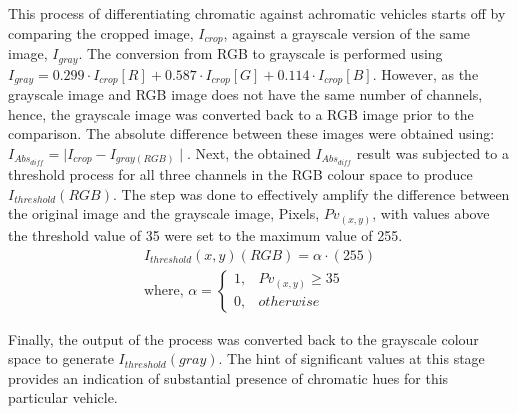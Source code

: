 This process of differentiating chromatic against achromatic vehicles starts off by comparing the cropped image, $I_{crop}$, against a grayscale version of the same image, $I_{gray}$. The conversion from RGB to grayscale is performed using $I_{gray} = 0.299 \cdot I_{crop}[R]+0.587 \cdot I_{crop}[G]+0.114 \cdot I_{crop}[B]$. However, as the grayscale image and RGB image does not have the same number of channels, hence, the grayscale image was converted back to a RGB image prior to the comparison.
The absolute difference between these images were obtained using: $I_{Abs_{diff}} = \mid I_{crop} - I_{gray(RGB)} \mid$. Next, the obtained $I_{Abs_{diff}}$ result was subjected to a threshold process for all three channels in the RGB colour space to produce $I_{threshold}(RGB)$. 
The step was done to effectively amplify the difference between the original image and the grayscale image, Pixels, $Pv_{(x,y)}$, with values above the threshold value of 35 were set to the maximum value of 255. 
\begin{align*}
\label{eq:threshabsolutediff}
I_{threshold}(x,y)(RGB) = \alpha \cdot (255) \\
\text{where, } 
\alpha = 
\begin{cases}
1, & Pv_{(x,y)} \geq 35\\
0, & otherwise
\end{cases}
\end{align*}

 Finally, the output of the process was converted back to the grayscale colour space to generate $I_{threshold}(gray)$. The hint of significant values at this stage provides an indication of substantial presence of chromatic hues for this particular vehicle.     


